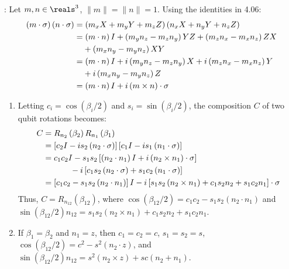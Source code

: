 \begingroup
\newcommand{\roto}[2]{R_{#1} \left( #2 \right)}
\newcommand{\coso}[1]{\cos \left( #1 \right)}
\newcommand{\sino}[1]{\sin \left( #1 \right)}
%
\par {}: Let $m, n \in \reals^3$, $\lVert m \rVert = \lVert n \rVert = 1$.
%
Using the identities in 4.06:
%
\begin{align*}
\left( m \cdot \sigma \right) \left( n \cdot \sigma \right) &= \left( m_x X + m_y Y + m_z Z \right) \left( n_x X + n_y Y + n_z Z \right) \\
&= \left( m \cdot n \right) I + \left( m_y n_z - m_z n_y \right) YZ + \left( m_z n_x - m_x n_z \right) ZX \notag \\
&\phantom{={}} + \left( m_x n_y - m_y n_z \right) XY \\
&= \left( m \cdot n \right) I + i \left( m_y n_z - m_z n_y \right) X + i \left( m_z n_x - m_x n_z \right) Y \notag \\
&\phantom{={}} + i \left( m_x n_y - m_y n_z \right) Z \\
&= \left( m \cdot n \right) I + i \left( m \times n \right) \cdot \sigma
\end{align*}
%
\begin{enumerate}
\item Letting $c_i = \coso{\beta_i / 2}$ and $s_i = \sino{\beta_i / 2}$, the composition $C$ of two qubit rotations becomes:
%
\begin{align*}
C &= \roto{n_2}{\beta_2} \roto{n_1}{\beta_1} \\
&= \left[ c_2 I - i s_2 \left( n_2 \cdot \sigma \right) \right] \left[ c_1 I - i s_1 \left( n_1 \cdot \sigma \right) \right] \\
&= c_1 c_2 I - s_1 s_2 \left[ \left( n_2 \cdot n_1 \right) I + i \left( n_2 \times n_1 \right) \cdot \sigma \right] \notag \\
&\phantom{= c_1 c_2 I {}} - i \left[ c_1 s_2 \left( n_2 \cdot \sigma \right) + s_1 c_2 \left( n_1 \cdot \sigma \right) \right] \\
&= \left[ c_1 c_2 - s_1 s_2 \left( n_2 \cdot n_1 \right) \right] I - i \left[ s_1 s_2 \left( n_2 \times n_1 \right) + c_1 s_2 n_2 + s_1 c_2 n_1 \right] \cdot \sigma \\
\end{align*}
%
Thus, $C = \roto{n_{12}}{\beta_{12}}$, where $\coso{\beta_{12} / 2} = c_1 c_2 - s_1 s_2 \left( n_2 \cdot n_1 \right)$ and $\sino{\beta_{12} / 2} n_{12} = s_1 s_2 \left( n_2 \times n_1 \right) + c_1 s_2 n_2 + s_1 c_2 n_1$.
%
\item If $\beta_1 = \beta_2$ and $n_1 = z$, then $c_1 = c_2 = c$, $s_1 = s_2 = s$, $\coso{\beta_{12} / 2} = c^2 - s^2 \left( n_2 \cdot z \right)$, and $\sino{\beta_{12} / 2} n_{12} = s^2 \left( n_2 \times z \right) + sc \left( n_2 + n_1 \right)$.
%
\end{enumerate}
\endgroup
